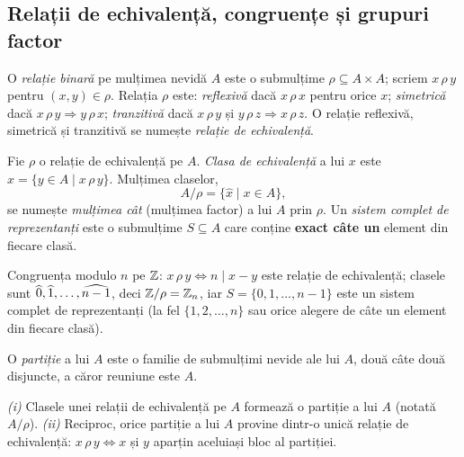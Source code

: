 \subsection{Relații de echivalență, congruențe și grupuri factor}\label{sec:avansat1}

\begin{definitie}\label{def:echiv}
O \emph{relație binară} pe mulțimea nevidă $A$ este o submulțime $\rho\subseteq A\times A$; scriem $x\,\rho\,y$ pentru $(x,y)\in\rho$. Relația $\rho$ este: \emph{reflexivă} dacă $x\,\rho\,x$ pentru orice $x$; \emph{simetrică} dacă $x\,\rho\,y\Rightarrow y\,\rho\,x$; \emph{tranzitivă} dacă $x\,\rho\,y$ și $y\,\rho\,z\Rightarrow x\,\rho\,z$. O relație reflexivă, simetrică și tranzitivă se numește \emph{relație de echivalență}.
\end{definitie}

\begin{definitie}
Fie $\rho$ o relație de echivalență pe $A$. \emph{Clasa de echivalență} a lui $x$ este $\widehat x=\{y\in A\mid x\,\rho\,y\}$. Mulțimea claselor,
\[
A/\rho=\{\widehat x\mid x\in A\},
\]
se numește \emph{mulțimea cât} (mulțimea factor) a lui $A$ prin $\rho$. Un \emph{sistem complet de reprezentanți} este o submulțime $S\subseteq A$ care conține \textbf{exact câte un} element din fiecare clasă.
\end{definitie}

\begin{exemplu}
Congruența modulo $n$ pe $\mathbb{Z}$: $x\,\rho\,y\iff n\mid x-y$ este relație de echivalență; clasele sunt $\widehat{0},\widehat{1},\dots,\widehat{n-1}$, deci $\mathbb{Z}/\rho=\mathbb{Z}_n$, iar $S=\{0,1,\dots,n-1\}$ este un sistem complet de reprezentanți (la fel $\{1,2,\dots,n\}$ sau orice alegere de câte un element din fiecare clasă).
\end{exemplu}

\begin{definitie}[partiție]
O \emph{partiție} a lui $A$ este o familie de submulțimi nevide ale lui $A$, două câte două disjuncte, a căror reuniune este $A$.
\end{definitie}

\begin{teorema}\label{teo:partitie}
\emph{(i)} Clasele unei relații de echivalență pe $A$ formează o partiție a lui $A$ (notată $A/\rho$). \emph{(ii)} Reciproc, orice partiție a lui $A$ provine dintr-o unică relație de echivalență: $x\,\rho\,y\iff x$ și $y$ aparțin aceluiași bloc al partiției.
\end{teorema}

